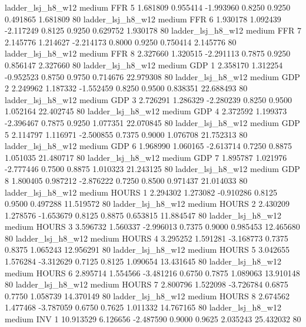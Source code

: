      ladder_lsj_h8_w12     medium      FFR                 5  1.681809 0.955414 -1.993960 0.8250 0.9250  0.491865    1.681809 80
     ladder_lsj_h8_w12     medium      FFR                 6  1.930178 1.092439 -2.117249 0.8125 0.9250  0.629752    1.930178 80
     ladder_lsj_h8_w12     medium      FFR                 7  2.145776 1.214627 -2.214173 0.8000 0.9250  0.750414    2.145776 80
     ladder_lsj_h8_w12     medium      FFR                 8  2.327660 1.320515 -2.291113 0.7875 0.9250  0.856147    2.327660 80
     ladder_lsj_h8_w12     medium      GDP                 1  2.358170 1.312254 -0.952523 0.8750 0.9750  0.714676   22.979308 80
     ladder_lsj_h8_w12     medium      GDP                 2  2.249962 1.187332 -1.552459 0.8250 0.9500  0.838351   22.688493 80
     ladder_lsj_h8_w12     medium      GDP                 3  2.726291 1.286329 -2.280239 0.8250 0.9500  1.052164   22.402745 80
     ladder_lsj_h8_w12     medium      GDP                 4  2.372592 1.199373 -2.396467 0.7875 0.9250  1.077351   22.070845 80
     ladder_lsj_h8_w12     medium      GDP                 5  2.114797 1.116971 -2.500855 0.7375 0.9000  1.076708   21.752313 80
     ladder_lsj_h8_w12     medium      GDP                 6  1.968990 1.060165 -2.613714 0.7250 0.8875  1.051035   21.480717 80
     ladder_lsj_h8_w12     medium      GDP                 7  1.895787 1.021976 -2.777446 0.7500 0.8875  1.010323   21.243125 80
     ladder_lsj_h8_w12     medium      GDP                 8  1.800405 0.987212 -2.876222 0.7250 0.8500  0.971437   21.014033 80
     ladder_lsj_h8_w12     medium    HOURS                 1  2.294302 1.273082 -0.910286 0.8125 0.9500  0.497288   11.519572 80
     ladder_lsj_h8_w12     medium    HOURS                 2  2.430209 1.278576 -1.653679 0.8125 0.8875  0.653815   11.884547 80
     ladder_lsj_h8_w12     medium    HOURS                 3  3.596732 1.560337 -2.996013 0.7375 0.9000  0.985453   12.465680 80
     ladder_lsj_h8_w12     medium    HOURS                 4  3.295252 1.591281 -3.168773 0.7375 0.8375  1.065243   12.956291 80
     ladder_lsj_h8_w12     medium    HOURS                 5  3.042655 1.576284 -3.312629 0.7125 0.8125  1.090654   13.431645 80
     ladder_lsj_h8_w12     medium    HOURS                 6  2.895714 1.554566 -3.481216 0.6750 0.7875  1.089063   13.910148 80
     ladder_lsj_h8_w12     medium    HOURS                 7  2.800796 1.522098 -3.726784 0.6875 0.7750  1.058739   14.370149 80
     ladder_lsj_h8_w12     medium    HOURS                 8  2.674562 1.477468 -3.787059 0.6750 0.7625  1.011332   14.767165 80
     ladder_lsj_h8_w12     medium      INV                 1 10.913529 6.126656 -2.487590 0.9000 0.9625  2.035243   25.432032 80
